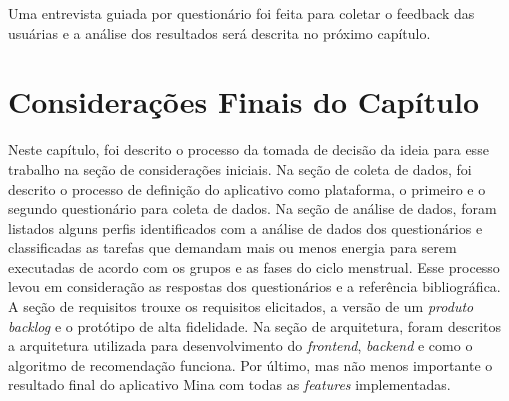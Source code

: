 Uma entrevista guiada por questionário foi feita para coletar o feedback das usuárias e a análise 
dos resultados será descrita no próximo capítulo. 


\section{Considerações Finais do Capítulo}

Neste capítulo, foi descrito o processo da tomada de decisão 
da ideia para 
esse trabalho na seção de considerações iniciais. Na seção 
de coleta de dados, 
foi descrito o processo de definição do aplicativo como 
plataforma, o primeiro e o segundo questionário
para coleta de dados. Na seção de análise de dados, foram 
listados alguns perfis identificados 
com a análise de dados dos questionários e classificadas as 
tarefas que demandam mais ou menos energia 
para serem executadas de acordo com os grupos e as fases do ciclo menstrual. 
Esse processo levou em consideração 
as respostas dos questionários e a referência bibliográfica. 
A seção de requisitos trouxe os requisitos elicitados, 
a versão de um \emph{produto backlog} e o protótipo de alta fidelidade. 
Na seção de arquitetura, foram descritos a arquitetura utilizada para desenvolvimento do 
\emph{frontend}, \emph{backend} e como o algoritmo de recomendação funciona. Por último, mas não menos importante 
o resultado final do aplicativo Mina com todas as \emph{features} implementadas.
